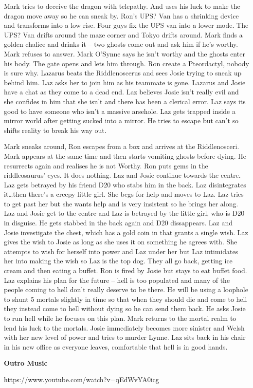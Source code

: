 \begin{multicols}{2}
Mark tries to deceive the dragon with telepathy. And uses his luck to make the dragon move away so he can sneak by. Ron’s UPS? Van has a shrinking device and transforms into a low rise. Four guys fix the UPS van into a lower mode. The UPS? Van drifts around the maze corner and Tokyo drifts around. Mark finds a golden chalice and drinks it – two ghosts come out and ask him if he’s worthy. Mark refuses to answer. Mark O’Synne says he isn’t worthy and the ghosts enter his body. The gate opens and lets him through. Ron create a Pteordactyl, nobody is sure why. Lazarus beats the Riddlenoscerus and sees Josie trying to sneak up behind him. Laz asks her to join him as his teammate is gone. Lazarus and Josie have a chat as they come to a dead end. Laz believes Josie isn’t really evil and she confides in him that she isn’t and there has been a clerical error. Laz says its good to have someone who isn’t a massive arsehole. Laz gets trapped inside a mirror world after getting sucked into a mirror. He tries to escape but can’t so shifts reality to break his way out.\medskip

Mark sneaks around, Ron escapes from a box and arrives at the Riddlenosceri. Mark appears at the same time and then starts vomiting ghosts before dying. He resurrects again and realises he is not Worthy. Ron puts gems in the riddleosaurus’ eyes. It does nothing. Laz and Josie continue towards the centre. Laz gets betrayed by his friend D20 who stabs him in the back. Laz disintegrates it…then there’s a creepy little girl. She begs for help and moves to Laz. Laz tries to get past her but she wants help and is very insistent so he brings her along. Laz and Josie get to the centre and Laz is betrayed by the little girl, who is D20 in disguise. He gets stabbed in the back again and D20 dissappears. Laz and Josie investigate the chest, which has a gold coin in that grants a single wish. Laz gives the wish to Josie as long as she uses it on something he agrees with. She attempts to wish for herself into power and Laz under her but Laz intimidates her into making the wish so Laz is the top dog. They all go back, getting ice cream and then eating a buffet. Ron is fired by Josie but stays to eat buffet food. Laz explains his plan for the future – hell is too populated and many of the people coming to hell don’t really deserve to be there. He will be using a loophole to shunt 5 mortals slightly in time so that when they should die and come to hell they instead come to hell without dying so he can send them back. He asks Josie to run hell while he focuses on this plan. Mark returns to the mortal realm to lend his luck to the mortals. Josie immediately becomes more sinister and Welsh with her new level of power and tries to murder Lynne. Laz sits back in his chair in his new office as everyone leaves, comfortable that hell is in good hands.\medskip

\textbf{Outro Music}\medskip

https://www.youtube.com/watch?v=qEdWvYA0icg\medskip

\end{multicols}

